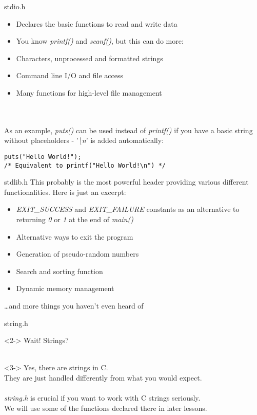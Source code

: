 \begin{frame}[fragile]{stdio.h}
	\begin{itemize}
		\item Declares the basic functions to read and write data
		\item You know \textit{printf()} and \textit{scanf()}, but this can do more:
		\item Characters, unprocessed and formatted strings
		\item Command line I/O and file access
		\item Many functions for high-level file management
	\end{itemize} \ \\ \ \\
	As an example, \textit{puts()} can be used instead of \textit{printf()} if you have a basic string without placeholders - '\textit{\textbackslash n}' is added automatically:
	\begin{lstlisting}[numbers=none]
puts("Hello World!");
/* Equivalent to printf("Hello World!\n") */
\end{lstlisting}
\end{frame}
\begin{frame}{stdlib.h}
	This probably is the most powerful header providing various different functionalities. Here is just an excerpt:
	\begin{itemize}
		\item \textit{EXIT\_SUCCESS} and \textit{EXIT\_FAILURE} constants as an alternative to returning \textit{0} or \textit{1} at the end of \textit{main()}
		\item Alternative ways to exit the program
		\item Generation of pseudo-random numbers
		\item Search and sorting function
		\item Dynamic memory management
	\end{itemize}
		\dots and more things you haven't even heard of
\end{frame}
\begin{frame}{string.h}
	\begin{uncoverenv}<2->
		Wait! Strings? \\ \ \\
	\end{uncoverenv}
	\begin{uncoverenv}<3->
		Yes, there are strings in C. \\
		They are just handled differently from what you would expect. \\ \ \\
		\textit{string.h} is crucial if you want to work with C strings seriously. \\
		We will use some of the functions declared there in later lessons.
	\end{uncoverenv}
\end{frame}
